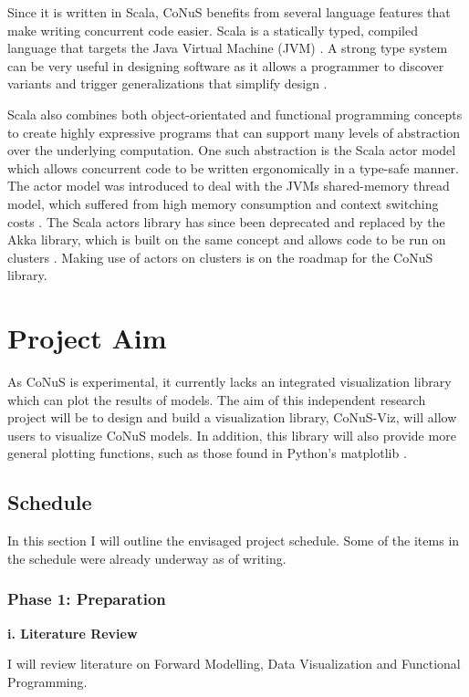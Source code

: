 \documentclass[12pt]{article}
\begin{document}
Since it is written in Scala, CoNuS benefits from several language features that make writing concurrent code easier. Scala is a statically typed, compiled language that targets the Java Virtual Machine (JVM) \cite{scala}. A strong type system can be very useful in designing software as it allows a programmer to discover variants and trigger generalizations that simplify design \cite{LAMMEL20081}. 

Scala also combines both object-orientated and functional programming concepts to create highly expressive programs that can support many levels of abstraction over the underlying computation. One such abstraction is the Scala actor model which allows concurrent code to be written ergonomically in a type-safe manner. The actor model was introduced to deal with the JVMs shared-memory thread model, which suffered from high memory consumption and context switching costs \cite{haller_odersky_2009}. The Scala actors library has since been deprecated and replaced by the Akka library, which is built on the same concept and allows code to be run on clusters \cite{akka}. Making use of actors on clusters is on the roadmap for the CoNuS library.

\section{Project Aim}
As CoNuS is experimental, it currently lacks an integrated visualization library which can plot the results of models. The aim of this independent research project will be to design and build a visualization library, CoNuS-Viz, will allow users to visualize CoNuS models. In addition, this library will also provide more general plotting functions, such as those found in Python's matplotlib \cite{matplotlib}.


\subsection{Schedule}
In this section I will outline the envisaged project schedule. Some of the items in the schedule were already underway as of writing.

\subsubsection{Phase 1: Preparation}

\textbf{i. Literature Review}

I will review literature on Forward Modelling, Data Visualization and Functional Programming. 
\end{document}
